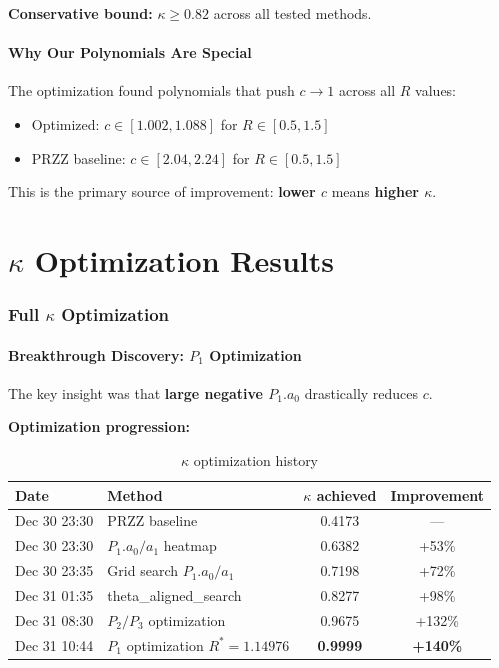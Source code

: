 \documentclass[11pt]{article}
\begin{document}
\textbf{Conservative bound:} $\kappa \geq 0.82$ across all tested methods.

\subsection{Why Our Polynomials Are Special}

The optimization found polynomials that push $c \to 1$ across all $R$ values:
\begin{itemize}
\item Optimized: $c \in [1.002, 1.088]$ for $R \in [0.5, 1.5]$
\item PRZZ baseline: $c \in [2.04, 2.24]$ for $R \in [0.5, 1.5]$
\end{itemize}

This is the primary source of improvement: \textbf{lower $c$} means \textbf{higher $\kappa$}.


\part{$\kappa$ Optimization Results}

\section{Full $\kappa$ Optimization}
\label{sec:kappa_opt}

\subsection{Breakthrough Discovery: $P_1$ Optimization}

The key insight was that \textbf{large negative $P_1.a_0$} drastically reduces $c$.

\textbf{Optimization progression:}

\begin{table}[h]
\centering
\caption{$\kappa$ optimization history}
\begin{tabular}{llcc}
\toprule
Date & Method & $\kappa$ achieved & Improvement \\
\midrule
Dec 30 23:30 & PRZZ baseline & 0.4173 & --- \\
Dec 30 23:30 & $P_1.a_0/a_1$ heatmap & 0.6382 & +53\% \\
Dec 30 23:35 & Grid search $P_1.a_0/a_1$ & 0.7198 & +72\% \\
Dec 31 01:35 & theta\_aligned\_search & 0.8277 & +98\% \\
Dec 31 08:30 & $P_2/P_3$ optimization & 0.9675 & +132\% \\
Dec 31 10:44 & $P_1$ optimization $R^*=1.14976$ & \textbf{0.9999} & \textbf{+140\%} \\
\bottomrule
\end{tabular}
\end{table}
\end{document}
